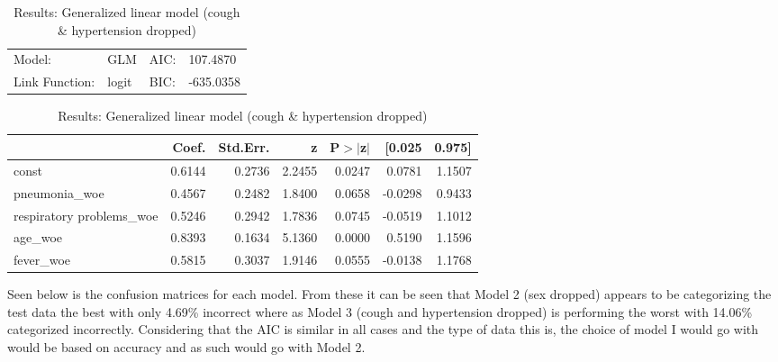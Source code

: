 \begin{table}[H]
	\renewcommand{\arraystretch}{1.25}
	\begin{center}
	\begin{tabular}{llll}
	\hline
	Model:              & GLM              & AIC:            & 107.4870   \\
	Link Function:      & logit            & BIC:            & -635.0358  \\
	\hline
	\end{tabular}
	\end{center}
	\begin{center}
	\begin{tabular}{lrrrrrr}
	\hline
	                          & Coef.  & Std.Err. &   z    & P$> |$z$|$ &  [0.025 & 0.975]  \\
	\hline
	\hline
	const                     & 0.6144 &   0.2736 & 2.2455 &      0.0247 &  0.0781 & 1.1507  \\
	pneumonia\_woe            & 0.4567 &   0.2482 & 1.8400 &      0.0658 & -0.0298 & 0.9433  \\
	respiratory problems\_woe & 0.5246 &   0.2942 & 1.7836 &      0.0745 & -0.0519 & 1.1012  \\
	age\_woe                  & 0.8393 &   0.1634 & 5.1360 &      0.0000 &  0.5190 & 1.1596  \\
	fever\_woe                & 0.5815 &   0.3037 & 1.9146 &      0.0555 & -0.0138 & 1.1768  \\
	\hline
	\end{tabular}
	\end{center}
	\caption{Results: Generalized linear model (cough \& hypertension dropped) \label{table:covid_results_3}}
\end{table}

Seen below is the confusion matrices for each model. From these it can be seen that Model 2 (sex dropped) appears to be categorizing the test data the best with only 4.69\% incorrect where as Model 3 (cough and hypertension dropped) is performing the worst with 14.06\% categorized incorrectly. Considering that the AIC is similar in all cases and the type of data this is, the choice of model I would go with would be based on accuracy and as such would go with Model 2.

